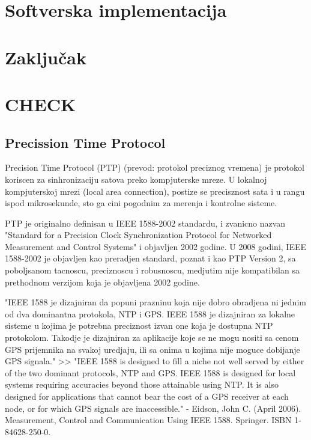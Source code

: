 \documentclass[a4paper,12pt, master]{etf}
\begin{document}
	\newpage

	\chapter{Softverska implementacija}

	\newpage

	\chapter{Zaključak}

	\newpage

	\chapter{CHECK}
	\section{Precission Time Protocol}
	Precision Time Protocol (PTP) (prevod: protokol preciznog vremena) je protokol
	koriscen za sinhronizaciju satova preko kompjuterske mreze. U lokalnoj
	kompjuterskoj mrezi (local area connection), postize se precisznost sata i u rangu
	ispod mikrosekunde, sto ga cini pogodnim za merenja i kontrolne sisteme.

	PTP je originalno definisan u IEEE 1588-2002 standardu, i zvanicno nazvan
	"Standard for a Precision Clock Synchronization Protocol for Networked Measurement
	and Control Systems" i objavljen 2002 godine. U 2008 godini, IEEE 1588-2002 je
	objavljen kao preradjen standard, poznat i kao PTP Version 2, sa poboljsanom tacnoscu,
	preciznoscu i robusnoscu, medjutim nije kompatibilan sa prethodnom verzijom koja je 
	objavljena 2002 godine.

	"IEEE 1588 je dizajniran da popuni prazninu koja nije dobro obradjena ni jednim od dva
	dominantna protokola, NTP i GPS. IEEE 1588 je dizajniran za lokalne sisteme u kojima je
	potrebna preciznost izvan one koja je dostupna NTP protokolom. Takodje je dizajniran za
	aplikacije koje se ne mogu nositi sa cenom GPS prijemnika na svakoj uredjaju, ili sa onima 
	u kojima nije moguce dobijanje GPS signala."
	>>
	"IEEE 1588 is designed to fill a niche not well served by either of the two dominant 
	protocols, NTP and GPS. IEEE 1588 is designed for local systems requiring accuracies 
	beyond those attainable using NTP. It is also designed for applications that cannot bear 
	the cost of a GPS receiver at each node, or for which GPS signals are inaccessible." - 
	Eidson, John C. (April
	2006). Measurement, Control and Communication Using IEEE 1588. Springer. ISBN 
	1-84628-250-0.
\end{document}
